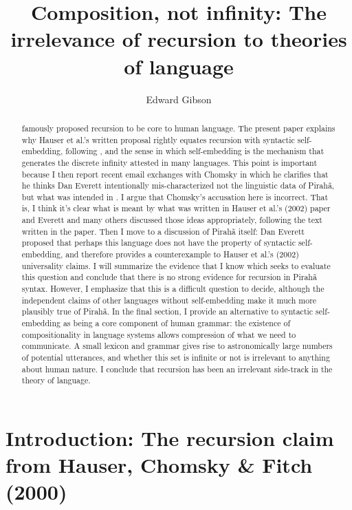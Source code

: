\documentclass{article}
\title[Composition, not infinity]{Composition, not infinity: The irrelevance of recursion to theories of language}
\author{Edward Gibson\affiliation{Department of Brain and Cognitive Sciences, MIT}}
\begin{document}
\maketitle

\begin{abstract}

\cite{hauser2002faculty} famously proposed recursion to be core to human language. The present paper explains why Hauser et al.'s written proposal rightly equates recursion with syntactic self-embedding, following \cite{pullum2020theorizing}, and the sense in which self-embedding is the mechanism that generates the discrete infinity attested in many languages. This point is important because I then report recent email exchanges with Chomsky in which he clarifies that he thinks Dan Everett intentionally mis-characterized not the linguistic data of Pirahã, but what was intended in \cite{hauser2002faculty}. I argue that Chomsky’s accusation here is incorrect. That is, I think it’s clear what is meant by what was written in Hauser et al.'s (2002) paper and Everett and many others discussed those ideas appropriately, following the text written in the paper.  Then I move to a discussion of Pirahã itself: Dan Everett proposed that perhaps this language does not have the property of syntactic self-embedding, and therefore provides a counterexample to Hauser et al.'s (2002) universality claims. I will summarize the evidence that I know which seeks to evaluate this question and conclude that there is no strong evidence for recursion in Pirahã syntax. However, I emphasize that this is a difficult question to decide, although the independent claims of other languages without self-embedding make it much more plausibly true of Pirahã. In the final section, I provide an alternative to syntactic self-embedding as being a core component of human grammar: the existence of compositionality in language systems allows compression of what we need to communicate. A small lexicon and grammar gives rise to astronomically large numbers of potential utterances, and whether this set is infinite or not is irrelevant to anything about human nature. I conclude that recursion has been an irrelevant side-track in the theory of language.

\end{abstract}

\section{Introduction: The recursion claim from Hauser, Chomsky \& Fitch (2000)}
\end{document}
